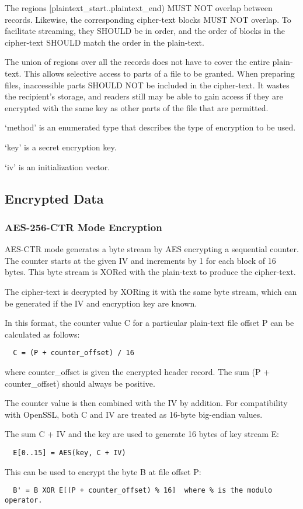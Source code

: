 \documentclass[10pt]{article}
\begin{document}
The regions [plaintext\_start..plaintext\_end) MUST NOT overlap between records.
Likewise, the corresponding cipher-text blocks MUST NOT overlap.
To facilitate streaming, they SHOULD be in order, and the order of blocks in the cipher-text SHOULD match the order
in the plain-text.

The union of regions over all the records does not have to cover the entire plain-text.
This allows selective access to parts of a file to be granted.
When preparing files, inaccessible parts SHOULD NOT be included in the cipher-text.
It wastes the recipient's storage, and readers still may be able to gain access if they are encrypted with the same key
as other parts of the file that are permitted.

`method' is an enumerated type that describes the type of encryption to be used.

`key' is a secret encryption key.

`iv' is an initialization vector.

\subsection{Encrypted Data}
\subsubsection{AES-256-CTR Mode Encryption}

AES-CTR mode generates a byte stream by AES encrypting a sequential counter.
The counter starts at the given IV and increments by 1 for each block of 16 bytes.
This byte stream is XORed with the plain-text to produce the cipher-text.

The cipher-text is decrypted by XORing it with the same byte stream, which can be generated if the IV and encryption
key are known.

In this format, the counter value C for a particular plain-text file offset P can be calculated as follows:
\begin{verbatim}
  C = (P + counter_offset) / 16
\end{verbatim}
where counter\_offset is given the encrypted header record.
The sum (P + counter\_offset) should always be positive.

The counter value is then combined with the IV by addition.
For compatibility with OpenSSL, both C and IV are treated as 16-byte big-endian values.

The sum C + IV and the key are used to generate 16 bytes of key stream E:
\begin{verbatim}
  E[0..15] = AES(key, C + IV)
\end{verbatim}
  This can be used to encrypt the byte B at file offset P:
\begin{verbatim}
  B' = B XOR E[(P + counter_offset) % 16]  where % is the modulo operator.
\end{verbatim}
\end{document}

